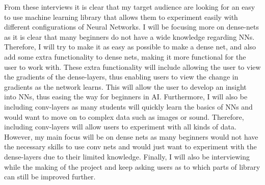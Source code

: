 \bigbreak
From these interviews it is clear that my target audience are looking for an easy to use machine learning library that allows them to experiment easily with different configurations of Neural Networks. I will be focusing more on dense-nets as it is clear that many beginners do not have a wide knowledge regarding NNs. Therefore, I will try to make it as easy as possible to make a dense net, and also add some extra functionality to dense nets, making it more functional for the user to work with. 
These extra functionality will include allowing the user to view the gradients of the dense-layers, thus enabling users to view the change in gradients as the network learns. This will allow the user to develop an insight into NNs, thus easing the way for beginners in AI.
Furthermore, I will also be including conv-layers as many students will quickly learn the basics of NNs and would want to move on to complex data such as images or sound. Therefore, including conv-layers will allow users to experiment with all kinds of data. However, my main focus will be on dense nets as many beginners would not have the necessary skills to use conv nets and would just want to experiment with the dense-layers due to their limited knowledge.
Finally, I will also be interviewing while the making of the project and keep asking users as to which parts of library can still be improved further.


